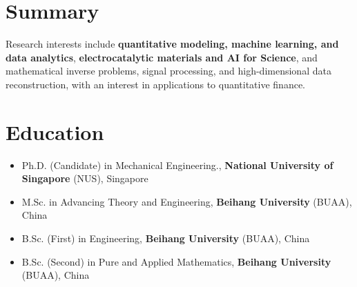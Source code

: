 \documentclass[a4paper,12pt]{article}
\begin{document}
\section{\textbf{Summary}}
Research interests include \textbf{quantitative modeling, machine learning, and data analytics}, \textbf{electrocatalytic materials and AI for Science}, and mathematical inverse problems, signal processing, and high-dimensional data reconstruction, with an interest in applications to quantitative finance.

\section{\textbf{Education}}

\begin{itemize}[leftmargin=1.2em, itemsep=1pt, topsep=0pt]
    \item Ph.D. (Candidate) in Mechanical Engineering.,  \textbf{National University of Singapore} (NUS), Singapore
     \item M.Sc. in Advancing Theory and Engineering, \textbf{Beihang University} (BUAA), China 
    \item B.Sc. (First) in Engineering, \textbf{Beihang University} (BUAA), China 
    \item B.Sc. (Second) in Pure and Applied Mathematics, \textbf{Beihang University} (BUAA), China 
\end{itemize}


\end{document}
